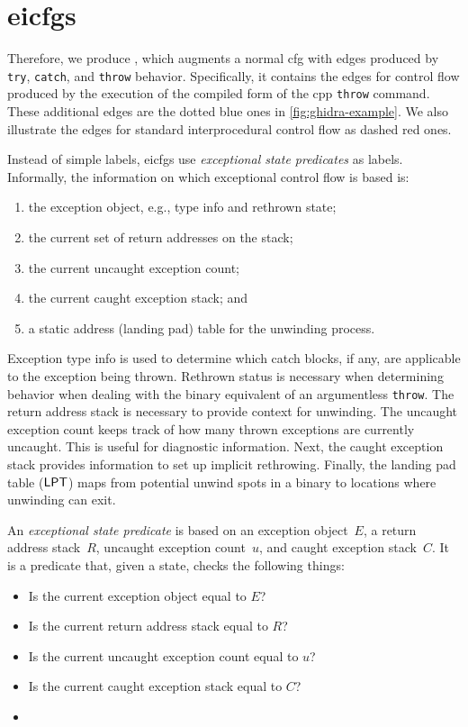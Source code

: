\section{\acsp*{eicfg}}\label{sec:eicfg}
Therefore, we produce , which augments a normal \ac{cfg} with edges produced by \lstinline|try|, \lstinline|catch|, and \lstinline|throw| behavior.
Specifically, it contains the edges for control flow produced by the execution of the compiled form of the \gls{cpp} \lstinline|throw| command.
These additional edges are the dotted blue ones in \cref{fig:ghidra-example}.
We also illustrate the edges for standard interprocedural control flow as dashed red ones.

Instead of simple labels, \acp{eicfg} use \emph{exceptional state predicates} as labels.
Informally, the information on which exceptional control flow is based is:
\begin{enumerate}
  \item the exception object, e.g., type info and rethrown state;
  \item the current set of return addresses on the stack;
  \item the current uncaught exception count;
  \item the current caught exception stack; and
  \item a static address (landing pad) table for the unwinding process.
\end{enumerate}
Exception type info is used to determine which catch blocks, if any, are applicable to the exception being thrown.
Rethrown status is necessary when determining behavior when dealing with the binary equivalent of an argumentless \lstinline{throw}.
The return address stack is necessary to provide context for unwinding.
The uncaught exception count keeps track of how many thrown exceptions are currently uncaught.
This is useful for diagnostic information.
Next, the caught exception stack provides information to set up implicit rethrowing.
Finally, the landing pad table ($\operatorname{\mathsf{LPT}}$) maps from potential unwind spots in a binary to locations where unwinding can exit.

\begin{definition}
  An \emph{exceptional state predicate} is based on an exception object~$E$, a return address stack~$R$, uncaught exception count~$u$, and caught exception stack~$C$.
  It is a predicate that, given a state, checks the following things:
  \begin{itemize}
    \item Is the current exception object equal to $E$?
    \item Is the current return address stack equal to $R$?
    \item Is the current uncaught exception count equal to $u$?
    \item Is the current caught exception stack equal to $C$?
    \item {}
  \end{itemize}
\end{definition}


